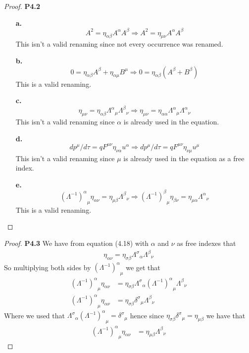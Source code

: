 \documentclass[11pt]{article}
\theoremstyle{definition}
\begin{document}
\cleardoublepage
\begin{proof}{\textbf{P4.2}}
\begin{itemize}
    \item [\bf{a.}]
    $$A^2 = \eta_{\alpha\beta}A^\alpha A^\beta
    \Rightarrow A^2 = \eta_{\mu\nu} A^\alpha A^\beta$$
    This isn't a valid renaming since not every occurrence was renamed.
    \item [\bf{b.}]
    $$0 = \eta_{\alpha\beta}A^\beta + \eta_{\alpha\mu}B^\mu
    \Rightarrow 0 = \eta_{\alpha\beta}(A^\beta + B^\beta)$$
    This is a valid renaming.
    \item [\bf{c.}]
    $$\eta_{\mu\nu} = \eta_{\alpha\beta}{\Lambda^\alpha}_\mu{\Lambda^\beta}_\nu
    \Rightarrow
    \eta_{\mu\nu} = \eta_{\alpha\alpha}{\Lambda^\alpha}_\mu{\Lambda^\alpha}_\nu$$
    This isn't a valid renaming since $\alpha$ is already used in the equation.
    \item [\bf{d.}]
    $$dp^\mu/d\tau = qF^{\mu\nu}\eta_{\nu\alpha}u^\alpha
    \Rightarrow
    dp^\mu/d\tau = qF^{\mu\nu}\eta_{\nu\mu}u^\mu$$
    This isn't a valid renaming since $\mu$ is already used in the equation as
    a free index.
    \item [\bf{e.}]
    $${(\Lambda^{-1})^\alpha}_\mu \eta_{\alpha\nu} = \eta_{\mu\beta}{\Lambda^{\beta}}_\nu
    \Rightarrow
    {(\Lambda^{-1})^\beta}_\mu \eta_{\beta\nu} = \eta_{\mu\alpha}{\Lambda^{\alpha}}_\nu$$
    This is a valid renaming.
\end{itemize}
\end{proof}
\cleardoublepage
\begin{proof}{\textbf{P4.3}}
    We have from equation (4.18) with $\alpha$ and $\nu$ as free indexes that
    \begin{align*}
        \eta_{\alpha\nu} = \eta_{\sigma\beta} {\Lambda^\sigma}_\alpha {\Lambda^\beta}_\nu
    \end{align*}
    So multiplying both sides by ${(\Lambda^{-1})^\alpha}_\mu$ we get that
    \begin{align*}
        {(\Lambda^{-1})^\alpha}_\mu \eta_{\alpha\nu}
        &= \eta_{\sigma\beta} {\Lambda^\sigma}_\alpha {(\Lambda^{-1})^\alpha}_\mu {\Lambda^\beta}_\nu\\
        {(\Lambda^{-1})^\alpha}_\mu \eta_{\alpha\nu}
        &= \eta_{\sigma\beta} {\delta^\sigma}_\mu {\Lambda^\beta}_\nu
    \end{align*}
    Where we used that
    ${\Lambda^\sigma}_\alpha {(\Lambda^{-1})^\alpha}_\mu = {\delta^\sigma}_\mu$
    hence since $\eta_{\sigma\beta} {\delta^\sigma}_\mu = \eta_{\mu\beta}$
    we have that
    \begin{align*}
        {(\Lambda^{-1})^\alpha}_\mu \eta_{\alpha\nu}
        &= \eta_{\mu\beta}  {\Lambda^\beta}_\nu
    \end{align*}
\end{proof}
\end{document}
